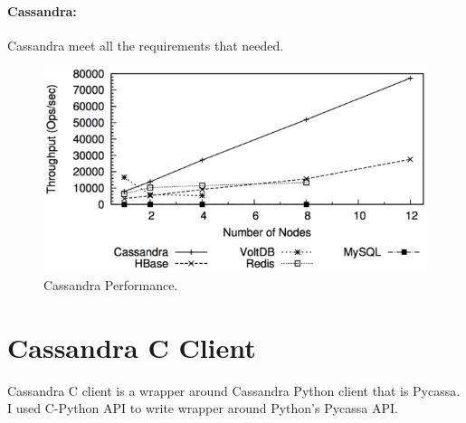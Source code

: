       \paragraph{Cassandra:} Cassandra meet all the requirements that needed.
      
          \begin{figure}[htb]
	    \centering
	    \includegraphics[scale=.5]{cassathpt.png}
	    \caption{Cassandra Performance\cite{cassathpt}.} 
	  \end{figure}
      
      \section{Cassandra C Client}
      Cassandra C client is a wrapper around Cassandra Python client that is Pycassa. I used C-Python API
      to write wrapper around Python's Pycassa API.